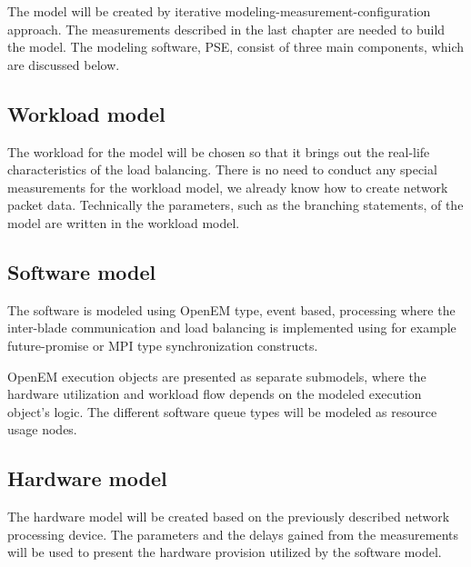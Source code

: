 The model will be created by iterative modeling-measurement-configuration approach. The measurements described in the last chapter are needed to build the model. The modeling software, PSE, consist of three main components, which are discussed below.

\subsection{Workload model}
The workload for the model will be chosen so that it brings out the real-life characteristics of the load balancing. There is no need to conduct any special measurements for the workload model, we already know how to create network packet data. Technically the parameters, such as the branching statements, of the model are written in the workload model.

\subsection{Software model}
The software is modeled using OpenEM type, event based, processing where the inter-blade communication and load balancing is implemented using for example future-promise or MPI type synchronization constructs.

OpenEM execution objects are presented as separate submodels, where the hardware utilization and workload flow depends on the modeled execution object's logic. The different software queue types will be modeled as resource usage nodes.

\subsection{Hardware model}
The hardware model will be created based on the previously described network processing device. The parameters and the delays gained from the measurements will be used to present the hardware provision utilized by the software model.

